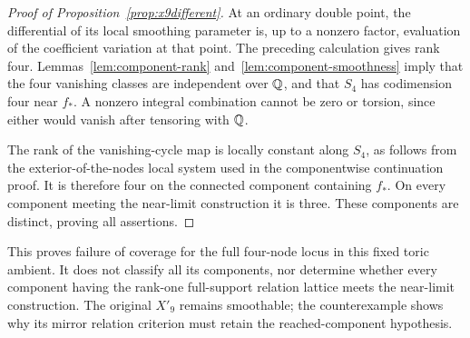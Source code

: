 \begin{proof}[Proof of Proposition~\ref{prop:x9different}]
At an ordinary double point, the differential of its local smoothing
parameter is, up to a nonzero factor, evaluation of the coefficient
variation at that point. The preceding calculation gives rank four.
Lemmas~\ref{lem:component-rank} and~\ref{lem:component-smoothness} imply
that the four vanishing classes are independent over $\mathbb Q$, and that
$S_4$ has codimension four near $f_*$. A nonzero integral combination
cannot be zero or torsion, since either would vanish after tensoring
with $\mathbb Q$.

The rank of the vanishing-cycle map is locally constant along $S_4$,
as follows from the exterior-of-the-nodes local system used in the
componentwise continuation proof. It is therefore four on the connected
component containing $f_*$. On every component meeting the near-limit
construction it is three. These components are distinct, proving all
assertions.
\end{proof}

\begin{remark}
This proves failure of coverage for the full four-node locus in this
fixed toric ambient. It does not classify all its components, nor
determine whether every component having the rank-one full-support
relation lattice meets the near-limit construction. The original
$X'_9$ remains smoothable; the counterexample shows why its mirror
relation criterion must retain the reached-component hypothesis.
\end{remark}
